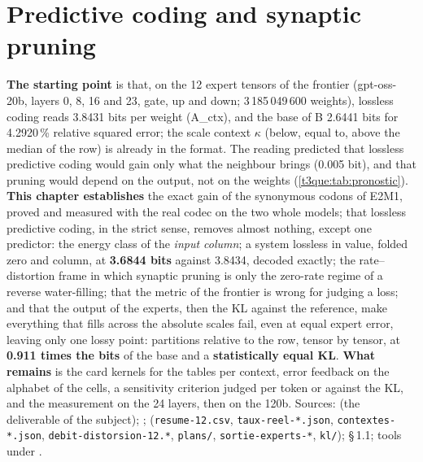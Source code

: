 \chapter{Predictive coding and synaptic pruning}\label{t3pre:ch}

\begin{origine}
\textbf{The starting point} is that, on the 12 expert tensors of the frontier (gpt-oss-20b, layers 0, 8, 16 and 23, gate, up and down; 3\,185\,049\,600 weights), lossless coding reads 3.8431 bits per weight (A\_ctx), and the base of B 2.6441 bits for 4.2920\,\% relative squared error; the scale context $\kappa$ (below, equal to, above the median of the row) is already in the format. The reading predicted that lossless predictive coding would gain only what the neighbour brings (0.005 bit), and that pruning would depend on the output, not on the weights (\cref{t3que:tab:pronostic}).
\textbf{This chapter establishes} the exact gain of the synonymous codons of E2M1, proved and measured with the real codec on the two whole models; that lossless predictive coding, in the strict sense, removes almost nothing, except one predictor: the energy class of the \emph{input column}; a system lossless in value, folded zero and column, at \textbf{3.6844 bits} against 3.8434, decoded exactly; the rate--distortion frame in which synaptic pruning is only the zero-rate regime of a reverse water-filling; that the metric of the frontier is wrong for judging a loss; and that the output of the experts, then the KL against the reference, make everything that fills across the absolute scales fail, even at equal expert error, leaving only one lossy point: partitions relative to the row, tensor by tensor, at \textbf{0.911 times the bits} of the base and a \textbf{statistically equal KL}.
\textbf{What remains} is the card kernels for the tables per context, error feedback on the alphabet of the cells, a sensitivity criterion judged per token or against the KL, and the measurement on the 24 layers, then on the 120b.
Sources:  (the deliverable of the subject); ;  (\texttt{resume-12.csv}, \texttt{taux-reel-*.json}, \texttt{contextes-*.json}, \texttt{debit-distorsion-12.*}, \texttt{plans/}, \texttt{sortie-experts-*}, \texttt{kl/});  §\,1.1; tools under .
\end{origine}

